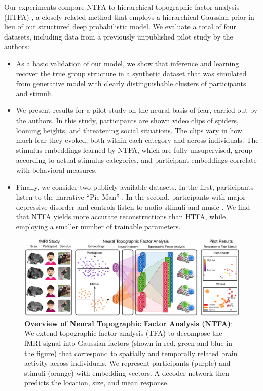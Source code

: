\documentclass[twoside]{article}
\begin{document}
Our experiments compare NTFA to hierarchical topographic factor analysis (HTFA) \citep{manning2014hierarchical,manning2018probabilistic}, a closely related method that employs a hierarchical Gaussian prior in lieu of our structured deep probabilistic model. We evaluate a total of four datasets, including data from a previously unpublished pilot study by the authors:
\begin{itemize}[labelwidth=0.5em, 
                labelsep=0.5em, 
                leftmargin=1.0em,
                topsep=0em,
                label={\tiny\raisebox{0.7ex}{\textbullet}}]
\item As a basic validation of our model, we show that inference and learning recover the true group structure in a synthetic dataset that was simulated from generative model with clearly distinguishable clusters of participants and stimuli. 

\item We present results for a pilot study on the neural basis of fear, carried out by the authors. In this study, participants are shown video clips of spiders, looming heights, and threatening social situations. The clips vary in how much fear they evoked, both within each category and across individuals. The stimulus embeddings learned by NTFA, which are fully unsupervised, group according to actual stimulus categories, and participant embeddings correlate with behavioral measures.

\item Finally, we consider two publicly available datasets. In the first, participants listen to the narrative ``Pie Man'' \citep{simony2016dynamic}. In the second, participants with major depressive disorder and controls listen to audio stimuli and music \citep{10.1371/journal.pone.0156859}. We find that NTFA yields more accurate reconstructions than HTFA, while employing a smaller number of trainable parameters.
\end{itemize}

\begin{figure}[!t]
    \includegraphics[width=\textwidth]{figures/neural-tfa-v5-cropped.pdf}
    \caption{\textbf{Overview of Neural Topographic Factor Analysis (NTFA)}: We extend topographic factor analysis (TFA) \citep{manning2014topographic,manning2014hierarchical} to decompose the fMRI signal into Gaussian factors (shown in red, green and blue in the figure) that correspond to spatially and temporally related brain activity across individuals. We represent participants (purple) and stimuli (orange) with embedding vectors. A decoder network then predicts the location, size, and mean response.}
    \label{fig:overview}
\end{figure}
\end{document}
